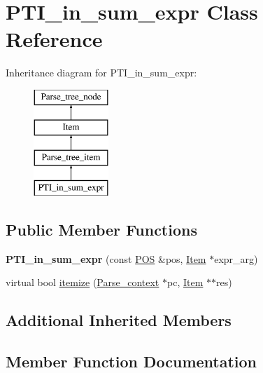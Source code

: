 \hypertarget{classPTI__in__sum__expr}{}\section{P\+T\+I\+\_\+in\+\_\+sum\+\_\+expr Class Reference}
\label{classPTI__in__sum__expr}
Inheritance diagram for P\+T\+I\+\_\+in\+\_\+sum\+\_\+expr\+:\begin{figure}[H]
\begin{center}
\leavevmode
\includegraphics[height=4.000000cm]{classPTI__in__sum__expr}
\end{center}
\end{figure}
\subsection*{Public Member Functions}
\begin{DoxyCompactItemize}
\item 
\mbox{\label{classPTI__in__sum__expr_ada935b5243d69e6db5231542b978e524}} 
{\bfseries P\+T\+I\+\_\+in\+\_\+sum\+\_\+expr} (const \mbox{\hyperlink{structYYLTYPE}{P\+OS}} \&pos, \mbox{\hyperlink{classItem}{Item}} $\ast$expr\+\_\+arg)
\item 
virtual bool \mbox{\hyperlink{classPTI__in__sum__expr_a4377e91b7dc6fe0027947f3995beba8b}{itemize}} (\mbox{\hyperlink{structParse__context}{Parse\+\_\+context}} $\ast$pc, \mbox{\hyperlink{classItem}{Item}} $\ast$$\ast$res)
\end{DoxyCompactItemize}
\subsection*{Additional Inherited Members}


\subsection{Member Function Documentation}
\mbox{\label{classPTI__in__sum__expr_a4377e91b7dc6fe0027947f3995beba8b}} 
